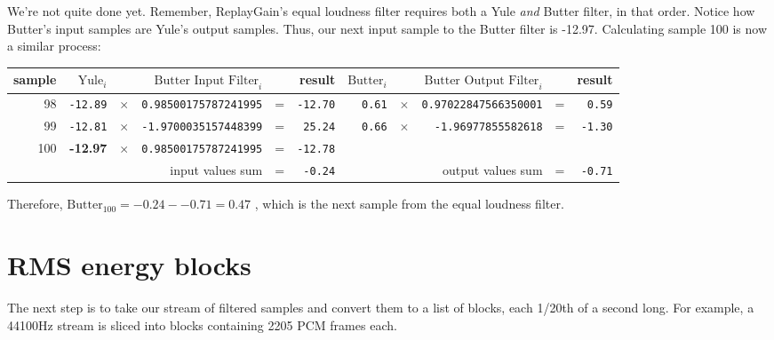 We're not quite done yet.
Remember, ReplayGain's equal loudness filter requires both
a Yule \textit{and} Butter filter, in that order.
Notice how Butter's input samples are Yule's output samples.
Thus, our next input sample to the Butter filter is -12.97.
Calculating sample 100 is now a similar process:
\begin{table}[h]
{
\begin{tabular}{|r|rcrcr|rcrcr|}
\hline
sample & $\text{Yule}_i$ & & $\text{Butter Input Filter}_i$ & & result &
$\text{Butter}_i$ & & $\text{Butter Output Filter}_i$ & & result \\
\hline
98 & \texttt{-12.89} & $\times$ & \texttt{0.98500175787241995} & = & \texttt{-12.70} &
\texttt{0.61} & $\times$ & \texttt{0.97022847566350001} & = & \texttt{0.59} \\

99 & \texttt{-12.81} & $\times$ & \texttt{-1.9700035157448399} & = & \texttt{25.24} &
\texttt{0.66} & $\times$ & \texttt{-1.96977855582618} & = & \texttt{-1.30} \\

100 & \textbf{-12.97} & $\times$ & \texttt{0.98500175787241995} & = & \texttt{-12.78} &
& & & & \\
\hline
\multicolumn{4}{|r}{input values sum} & = & \texttt{-0.24} &
\multicolumn{3}{r}{output values sum} & = & \texttt{-0.71} \\
\hline
\end{tabular}
}
\end{table}
\par
\noindent
Therefore, $\text{Butter}_{100} = -0.24 - -0.71 = 0.47$
, which is the next sample from the equal loudness filter.

\section{RMS energy blocks}
The next step is to take our stream of filtered samples and convert
them to a list of blocks, each 1/20th of a second long.
For example, a 44100Hz stream is sliced into blocks containing
2205 PCM frames each.

